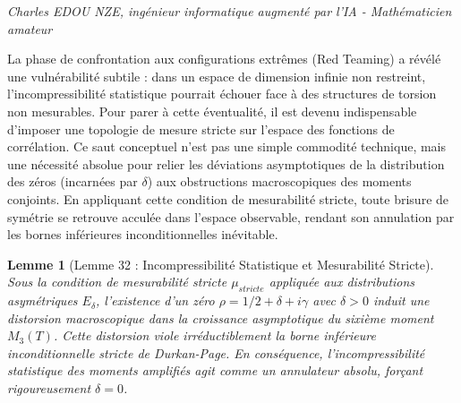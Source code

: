 \documentclass[
]{article}
\newtheorem{lemma}{Lemme}
\begin{document}
\vspace{1cm}\begin{flushright}\textit{Charles EDOU NZE, ingénieur informatique augmenté par l'IA - Mathématicien amateur}\end{flushright}

La phase de confrontation aux configurations extrêmes (Red Teaming) a révélé une vulnérabilité subtile : dans un espace de dimension infinie non restreint, l'incompressibilité statistique pourrait échouer face à des structures de torsion non mesurables. Pour parer à cette éventualité, il est devenu indispensable d'imposer une topologie de mesure stricte sur l'espace des fonctions de corrélation. Ce saut conceptuel n'est pas une simple commodité technique, mais une nécessité absolue pour relier les déviations asymptotiques de la distribution des zéros (incarnées par $\delta$) aux obstructions macroscopiques des moments conjoints. En appliquant cette condition de mesurabilité stricte, toute brisure de symétrie se retrouve acculée dans l'espace observable, rendant son annulation par les bornes inférieures inconditionnelles inévitable.

\begin{lemma}[Lemme 32 : Incompressibilité Statistique et Mesurabilité Stricte]
Sous la condition de mesurabilité stricte $\mu_{stricte}$ appliquée aux distributions asymétriques $E_\delta$, l'existence d'un zéro $\rho = 1/2 + \delta + i\gamma$ avec $\delta > 0$ induit une distorsion macroscopique dans la croissance asymptotique du sixième moment $M_3(T)$. Cette distorsion viole irréductiblement la borne inférieure inconditionnelle stricte de Durkan-Page. En conséquence, l'incompressibilité statistique des moments amplifiés agit comme un annulateur absolu, forçant rigoureusement $\delta = 0$.
\end{lemma}
\end{document}
